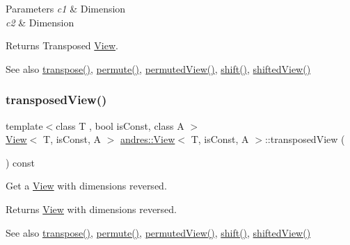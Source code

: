 \begin{DoxyParams}{Parameters}
{\em c1} & Dimension \\
\hline
{\em c2} & Dimension \\
\hline
\end{DoxyParams}
\begin{DoxyReturn}{Returns}
Transposed \hyperlink{classandres_1_1View}{View}. 
\end{DoxyReturn}
\begin{DoxySeeAlso}{See also}
\hyperlink{classandres_1_1View_ad7acad354a5be4086b9b21ab88b18d82}{transpose()}, \hyperlink{classandres_1_1View_a375d3e199e219568d8a6205e4088289b}{permute()}, \hyperlink{classandres_1_1View_ad5ff9254de815d85b6c6748bad3fcd89}{permuted\+View()}, \hyperlink{classandres_1_1View_a476957393b3b21333bc665e852da47ad}{shift()}, \hyperlink{classandres_1_1View_abc938823dc964548f0f44ab10bca6b59}{shifted\+View()} 
\end{DoxySeeAlso}
\mbox{\label{classandres_1_1View_a02ed325250a7feedb41ab3531da39841}} 
\subsubsection{\texorpdfstring{transposed\+View()}{transposedView()}\hspace{0.1cm}{\footnotesize\ttfamily [2/2]}}
{\footnotesize\ttfamily template$<$class T , bool is\+Const, class A $>$ \\
\hyperlink{classandres_1_1View}{View}$<$ T, is\+Const, A $>$ \hyperlink{classandres_1_1View}{andres\+::\+View}$<$ T, is\+Const, A $>$\+::transposed\+View (\begin{DoxyParamCaption}{ }\end{DoxyParamCaption}) const\hspace{0.3cm}{\ttfamily [inline]}}

Get a \hyperlink{classandres_1_1View}{View} with dimensions reversed.

\begin{DoxyReturn}{Returns}
\hyperlink{classandres_1_1View}{View} with dimensions reversed. 
\end{DoxyReturn}
\begin{DoxySeeAlso}{See also}
\hyperlink{classandres_1_1View_ad7acad354a5be4086b9b21ab88b18d82}{transpose()}, \hyperlink{classandres_1_1View_a375d3e199e219568d8a6205e4088289b}{permute()}, \hyperlink{classandres_1_1View_ad5ff9254de815d85b6c6748bad3fcd89}{permuted\+View()}, \hyperlink{classandres_1_1View_a476957393b3b21333bc665e852da47ad}{shift()}, \hyperlink{classandres_1_1View_abc938823dc964548f0f44ab10bca6b59}{shifted\+View()} 
\end{DoxySeeAlso}
\mbox{\label{classandres_1_1View_a7c7ea156cd617f1b0791a96892036247}} 

